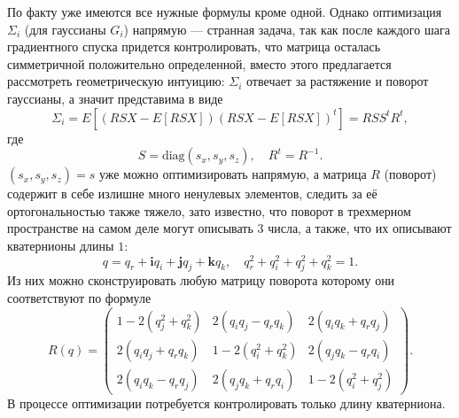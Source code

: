 По факту уже имеются все нужные формулы кроме одной. Однако оптимизация $\Sigma_i$ (для гауссианы $G_i$) напрямую --- странная задача, так как после каждого шага градиентного спуска придется контролировать, что матрица осталась симметричной положительно определенной, вместо этого предлагается рассмотреть геометрическую интуицию: $\Sigma_i$ отвечает за растяжение и поворот гауссианы, а значит представима в виде
%
\[
	\Sigma_i = E \left[
		(RSX - E[RSX]) (RSX - E[RSX])^t
	\right] = RSS^tR^t,
\]
%
где
%
\[
	S = \mathrm{diag} (s_x, s_y, s_z), \quad R^t=R^{-1}.
\]
%
$(s_x, s_y, s_z) = s$ уже можно оптимизировать напрямую, а матрица $R$ (поворот) содержит в себе излишне много ненулевых элементов, следить за её ортогональностью также тяжело, зато известно, что поворот в трехмерном пространстве на самом деле могут описывать $3$ числа, а также, что их описывают кватернионы длины $1$:
%
\[
	q = q_r + \mathbf i q_i + \mathbf j q_j + \mathbf k q_k, \quad
	q_r^2 + q_i^2 + q_j^2 + q_k^2 = 1.
\]
%
Из них можно сконструировать любую матрицу поворота которому они соответствуют по формуле
%
\[
	R(q) = \begin{pmatrix}
		1 - 2(q_j^2 + q_k^2) & 2(q_i q_j - q_r q_k) & 2(q_i q_k + q_r q_j) \\
		2(q_i q_j + q_r q_k) & 1 - 2(q_i^2 + q_k^2) & 2(q_j q_k - q_r q_i) \\
		2(q_i q_k - q_r q_j) & 2(q_j q_k + q_r q_i) & 1 - 2(q_i^2 + q_j^2)
	\end{pmatrix}.
\]
%
В процессе оптимизации потребуется контролировать только длину кватерниона.